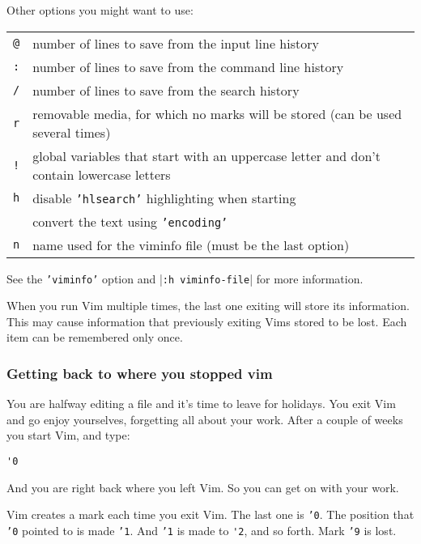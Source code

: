 Other options you might want to use:
\begin{center} \begin{longtable}{c l}
				\texttt{@} & number of lines to save from the input line history \\
				\texttt{:} & number of lines to save from the command line history \\
				\texttt{/} & number of lines to save from the search history \\
				\texttt{r} & removable media, for which no marks will be stored (can be used several times) \\
				\texttt{!} & global variables that start with an uppercase letter and don't contain lowercase letters \\
				\texttt{h} & disable \texttt{'hlsearch'} highlighting when starting \\
				\texttt{%
				\texttt{c} & convert the text using \texttt{'encoding'} \\
				\texttt{n} & name used for the viminfo file (must be the last option) \\
\end{longtable} \end{center}

See the \texttt{'viminfo'} option and |\texttt{:h viminfo-file}| for more information.

When you run Vim multiple times, the last one exiting will store its information.
This may cause information that previously exiting Vims stored to be lost.
Each item can be remembered only once.

\subsubsection{Getting back to where you stopped vim}
You are halfway editing a file and it's time to leave for holidays.
You exit Vim and go enjoy yourselves, forgetting all about your work.
After a couple of weeks you start Vim, and type:

\begin{Verbatim}[samepage=true]
 '0
\end{Verbatim}

And you are right back where you left Vim.
So you can get on with your work.

Vim creates a mark each time you exit Vim.
The last one is \texttt{'0}.
The position that \texttt{'0} pointed to is made \texttt{'1}.
And \texttt{'1} is made to \verb!'2!, and so forth.
Mark \texttt{'9} is lost.


